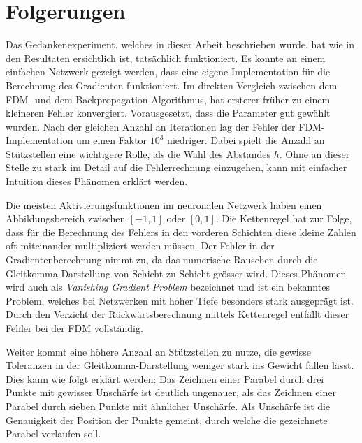 %
%
%
\section{Folgerungen
\label{ableitung:section:folgerungen}}
Das Gedankenexperiment, welches in dieser Arbeit beschrieben wurde, hat wie in den Resultaten ersichtlich ist, tatsächlich funktioniert. Es konnte an einem einfachen Netzwerk gezeigt werden, dass eine eigene Implementation für die Berechnung des Gradienten funktioniert. Im direkten Vergleich zwischen dem FDM- und dem Backpropagation-Algorithmus, hat ersterer früher zu einem kleineren Fehler konvergiert. Vorausgesetzt, dass die Parameter gut gewählt wurden. Nach der gleichen Anzahl an Iterationen lag der Fehler der FDM-Implementation um einen Faktor $10^3$ niedriger. Dabei spielt die Anzahl an Stützstellen eine wichtigere Rolle, als die Wahl des Abstandes $h$. Ohne an dieser Stelle zu stark im Detail auf die Fehlerrechnung einzugehen, kann mit einfacher Intuition dieses Phänomen erklärt werden.

Die meisten Aktivierungsfunktionen im neuronalen Netzwerk haben einen Abbildungsbereich zwischen $[-1, 1]$ oder $[0, 1]$. Die Kettenregel hat zur Folge, dass für die Berechnung des Fehlers in den vorderen Schichten diese kleine Zahlen oft miteinander multipliziert werden müssen. Der Fehler in der Gradientenberechnung nimmt zu, da das numerische Rauschen durch die Gleitkomma-Darstellung von Schicht zu Schicht grösser wird. Dieses Phänomen wird auch als \textit{Vanishing Gradient Problem} bezeichnet und ist ein bekanntes Problem, welches bei Netzwerken mit hoher Tiefe besonders stark ausgeprägt ist. Durch den Verzicht der Rückwärtsberechnung mittels Kettenregel entfällt dieser Fehler bei der FDM vollständig. 

Weiter kommt eine höhere Anzahl an Stützstellen zu nutze, die gewisse Toleranzen in der Gleitkomma-Darstellung weniger stark ins Gewicht fallen lässt. Dies kann wie folgt erklärt werden: Das Zeichnen einer Parabel durch drei Punkte mit gewisser Unschärfe ist deutlich ungenauer, als das Zeichnen einer Parabel durch sieben Punkte mit ähnlicher Unschärfe. Als Unschärfe ist die Genauigkeit der Position der Punkte gemeint, durch welche die gezeichnete Parabel verlaufen soll.

